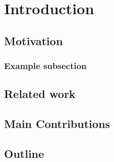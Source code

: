 \chapter{Introduction}
\section{Motivation}
\subsection{Example subsection}
\section{Related work}
\section{Main Contributions}
\section{Outline}